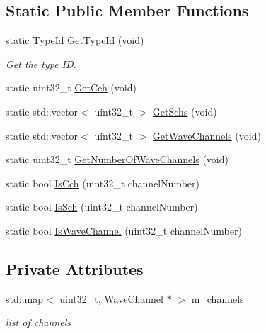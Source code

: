 \subsection*{Static Public Member Functions}
\begin{DoxyCompactItemize}
\item 
static \hyperlink{classns3_1_1TypeId}{Type\+Id} \hyperlink{classns3_1_1ChannelManager_a6f786b467cdec0a6497580b919817f38}{Get\+Type\+Id} (void)
\begin{DoxyCompactList}\small\item\em Get the type ID. \end{DoxyCompactList}\item 
static uint32\+\_\+t \hyperlink{classns3_1_1ChannelManager_adbf5775f7d647b14c14fdcdbb00f67d0}{Get\+Cch} (void)
\item 
static std\+::vector$<$ uint32\+\_\+t $>$ \hyperlink{classns3_1_1ChannelManager_ad1e03bbf5452e18bde977611904a549b}{Get\+Schs} (void)
\item 
static std\+::vector$<$ uint32\+\_\+t $>$ \hyperlink{classns3_1_1ChannelManager_a4b4ce965b76235f8dc9fba47357908c3}{Get\+Wave\+Channels} (void)
\item 
static uint32\+\_\+t \hyperlink{classns3_1_1ChannelManager_a40722c6f8946e1e3952c0688d633f275}{Get\+Number\+Of\+Wave\+Channels} (void)
\item 
static bool \hyperlink{classns3_1_1ChannelManager_a3d68a3f8099eaa381bdfddac4b7ccfa6}{Is\+Cch} (uint32\+\_\+t channel\+Number)
\item 
static bool \hyperlink{classns3_1_1ChannelManager_aad2c63ee642069541b8c45da080a5f22}{Is\+Sch} (uint32\+\_\+t channel\+Number)
\item 
static bool \hyperlink{classns3_1_1ChannelManager_ae06978b638275c7a37ba6505e2104f92}{Is\+Wave\+Channel} (uint32\+\_\+t channel\+Number)
\end{DoxyCompactItemize}
\subsection*{Private Attributes}
\begin{DoxyCompactItemize}
\item 
std\+::map$<$ uint32\+\_\+t, \hyperlink{structns3_1_1ChannelManager_1_1WaveChannel}{Wave\+Channel} $\ast$ $>$ \hyperlink{classns3_1_1ChannelManager_ab36f83192053de6c16e1b605f12f5f67}{m\+\_\+channels}
\begin{DoxyCompactList}\small\item\em list of channels \end{DoxyCompactList}\end{DoxyCompactItemize}
